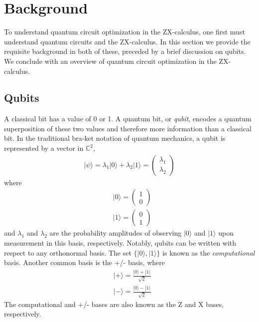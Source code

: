 \chapter[Background]{Background} \label{ch:bg}


To understand quantum circuit optimization in the ZX-calculus, one first must understand quantum circuits and the ZX-calculus.
In this section we provide the requisite background in both of these, preceded by a brief discussion on qubits.
We conclude with an overview of quantum circuit optimization in the ZX-calculus.

\section{Qubits}\label{sec:qubits}

A classical bit has a value of 0 or 1.
A quantum bit, or \emph{qubit}, encodes a quantum superposition of these two values and therefore more information than a classical bit.
In the traditional bra-ket notation of quantum mechanics, a qubit is represented by a vector in $\mathbb{C}^2$,
\begin{align*}
  |\psi\rangle = \lambda_1 |0\rangle + \lambda_2 |1\rangle = \begin{pmatrix}\lambda_1 \\ \lambda_2 \end{pmatrix}
\end{align*}
where
\begin{align*}
  & |0\rangle = \begin{pmatrix}1 \\ 0\end{pmatrix} \\
  & |1\rangle = \begin{pmatrix}0 \\ 1\end{pmatrix}
\end{align*}
and $\lambda_1$ and $\lambda_2$ are the probability amplitudes of observing $|0\rangle$ and $|1\rangle$ upon measurement in this basis, respectively.
Notably, qubits can be written with respect to any orthonormal basis.
The set $\{|0\rangle, |1\rangle\}$ is known as the \emph{computational} basis.
Another common basis is the +/- basis, where
\begin{align*}
  & |+\rangle = \frac{|0\rangle + |1\rangle}{\sqrt{2}} \\
  & |-\rangle = \frac{|0\rangle - |1\rangle}{\sqrt{2}}
\end{align*}
The computational and +/- bases are also known as the Z and X bases, respectively.

